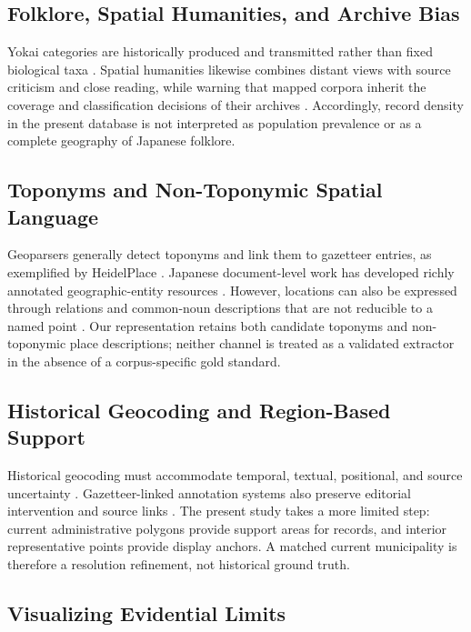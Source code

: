 \documentclass{isprs}
\begin{document}
\subsection{Folklore, Spatial Humanities, and Archive Bias}

Yokai categories are historically produced and transmitted rather than fixed biological taxa \cite{foster2024}. Spatial humanities likewise combines distant views with source criticism and close reading, while warning that mapped corpora inherit the coverage and classification decisions of their archives \cite{gregory2014}. Accordingly, record density in the present database is not interpreted as population prevalence or as a complete geography of Japanese folklore.

\subsection{Toponyms and Non-Toponymic Spatial Language}

Geoparsers generally detect toponyms and link them to gazetteer entries, as exemplified by HeidelPlace \cite{richter2017}. Japanese document-level work has developed richly annotated geographic-entity resources \cite{higashiyama2024}. However, locations can also be expressed through relations and common-noun descriptions that are not reducible to a named point \cite{stock2022}. Our representation retains both candidate toponyms and non-toponymic place descriptions; neither channel is treated as a validated extractor in the absence of a corpus-specific gold standard.

\subsection{Historical Geocoding and Region-Based Support}

Historical geocoding must accommodate temporal, textual, positional, and source uncertainty \cite{cura2018}. Gazetteer-linked annotation systems also preserve editorial intervention and source links \cite{simon2017}. The present study takes a more limited step: current administrative polygons provide support areas for records, and interior representative points provide display anchors. A matched current municipality is therefore a resolution refinement, not historical ground truth.

\subsection{Visualizing Evidential Limits}
\end{document}
